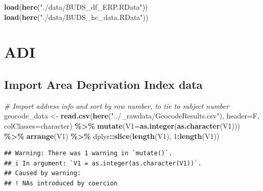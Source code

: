 \documentclass[
]{article}
\newenvironment{Shaded}{\begin{snugshade}}{\end{snugshade}}
\newcommand{\AttributeTok}[1]{\textcolor[rgb]{0.13,0.29,0.53}{#1}}
\newcommand{\CommentTok}[1]{\textcolor[rgb]{0.56,0.35,0.01}{\textit{#1}}}
\newcommand{\DecValTok}[1]{\textcolor[rgb]{0.00,0.00,0.81}{#1}}
\newcommand{\FunctionTok}[1]{\textcolor[rgb]{0.13,0.29,0.53}{\textbf{#1}}}
\newcommand{\NormalTok}[1]{#1}
\newcommand{\OtherTok}[1]{\textcolor[rgb]{0.56,0.35,0.01}{#1}}
\newcommand{\SpecialCharTok}[1]{\textcolor[rgb]{0.81,0.36,0.00}{\textbf{#1}}}
\newcommand{\StringTok}[1]{\textcolor[rgb]{0.31,0.60,0.02}{#1}}
\begin{document}
\begin{Shaded}
\begin{Highlighting}[]
\FunctionTok{load}\NormalTok{(}\FunctionTok{here}\NormalTok{(}\StringTok{"./data/BUDS\_df\_ERP.RData"}\NormalTok{))}
\FunctionTok{load}\NormalTok{(}\FunctionTok{here}\NormalTok{(}\StringTok{"./data/BUDS\_hc\_data.RData"}\NormalTok{))}
\end{Highlighting}
\end{Shaded}

\hypertarget{adi}{%
\section{ADI}\label{adi}}

\hypertarget{import-area-deprivation-index-data}{%
\subsection{Import Area Deprivation Index
data}\label{import-area-deprivation-index-data}}

\begin{Shaded}
\begin{Highlighting}[]
\CommentTok{\# Import address info and sort by row number, to tie to subject number}
\NormalTok{geocode\_data }\OtherTok{\textless{}{-}} \FunctionTok{read.csv}\NormalTok{(}\FunctionTok{here}\NormalTok{(}\StringTok{"../\_rawdata/GeocodeResults.csv"}\NormalTok{), }\AttributeTok{header=}\NormalTok{F, }\AttributeTok{colClasses=}\StringTok{\textquotesingle{}character\textquotesingle{}}\NormalTok{) }\SpecialCharTok{\%\textgreater{}\%}
  \FunctionTok{mutate}\NormalTok{(}\AttributeTok{V1=}\FunctionTok{as.integer}\NormalTok{(}\FunctionTok{as.character}\NormalTok{(V1))) }\SpecialCharTok{\%\textgreater{}\%}
  \FunctionTok{arrange}\NormalTok{(V1) }\SpecialCharTok{\%\textgreater{}\%}
\NormalTok{  dplyr}\SpecialCharTok{::}\FunctionTok{slice}\NormalTok{(}\FunctionTok{length}\NormalTok{(V1), }\DecValTok{1}\SpecialCharTok{:}\FunctionTok{length}\NormalTok{(V1))}
\end{Highlighting}
\end{Shaded}

\begin{verbatim}
## Warning: There was 1 warning in `mutate()`.
## i In argument: `V1 = as.integer(as.character(V1))`.
## Caused by warning:
## ! NAs introduced by coercion
\end{verbatim}
\end{document}
